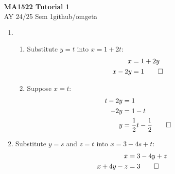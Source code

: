 \documentclass[12pt, a4paper]{article}
\newcommand{\mytitle}{MA1522 Tutorial 1}
\newcommand{\myauthor}{github/omgeta}
\newcommand{\mydate}{AY 24/25 Sem 1}
\begin{document}
\raggedright
\footnotesize
\begin{center}
{\normalsize{\textbf{\mytitle}}} \\
{\footnotesize{\mydate\hspace{2pt}\textemdash\hspace{2pt}\myauthor}}
\end{center}

\begin{enumerate}[Q\arabic*.]
  \item
  \begin{enumerate}[(\alph*)]
    \item Substitute $y = t$ into $x = 1 + 2t$:
      \begin{align*}
        x &= 1 + 2y \\
        x - 2y &= 1 \qed
      \end{align*}
    \item Suppose $x = t$:
      \begin{align*}
        t - 2y &= 1 \\
        -2y &= 1 - t \\
        y &= \frac{1}{2}t - \frac{1}{2} \qed
      \end{align*}
  \end{enumerate}
  \item Substitute $y = s$ and $z = t$ into $x = 3 -4s +t$:
    \begin{align*}
      x &= 3 - 4y + z \\
      x + 4y - z &= 3 \qed  
    \end{align*}


\end{enumerate}
\end{document}
